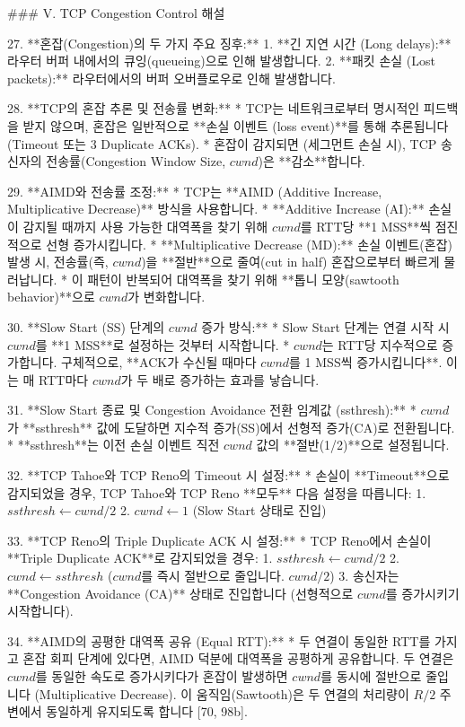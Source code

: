 ### V. TCP Congestion Control 해설

27. **혼잡(Congestion)의 두 가지 주요 징후:**
    1.  **긴 지연 시간 (Long delays):** 라우터 버퍼 내에서의 큐잉(queueing)으로 인해 발생합니다.
    2.  **패킷 손실 (Lost packets):** 라우터에서의 버퍼 오버플로우로 인해 발생합니다.

28. **TCP의 혼잡 추론 및 전송률 변화:**
    *   TCP는 네트워크로부터 명시적인 피드백을 받지 않으며, 혼잡은 일반적으로 **손실 이벤트 (loss event)**를 통해 추론됩니다 (Timeout 또는 3 Duplicate ACKs).
    *   혼잡이 감지되면 (세그먼트 손실 시), TCP 송신자의 전송률(Congestion Window Size, $cwnd$)은 **감소**합니다.

29. **AIMD와 전송률 조정:**
    *   TCP는 **AIMD (Additive Increase, Multiplicative Decrease)** 방식을 사용합니다.
    *   **Additive Increase (AI):** 손실이 감지될 때까지 사용 가능한 대역폭을 찾기 위해 $cwnd$를 RTT당 **1 MSS**씩 점진적으로 선형 증가시킵니다.
    *   **Multiplicative Decrease (MD):** 손실 이벤트(혼잡) 발생 시, 전송률(즉, $cwnd$)을 **절반**으로 줄여(cut in half) 혼잡으로부터 빠르게 물러납니다.
    *   이 패턴이 반복되어 대역폭을 찾기 위해 **톱니 모양(sawtooth behavior)**으로 $cwnd$가 변화합니다.

30. **Slow Start (SS) 단계의 $cwnd$ 증가 방식:**
    *   Slow Start 단계는 연결 시작 시 $cwnd$를 **1 MSS**로 설정하는 것부터 시작합니다.
    *   $cwnd$는 RTT당 지수적으로 증가합니다. 구체적으로, **ACK가 수신될 때마다 $cwnd$를 1 MSS씩 증가시킵니다**. 이는 매 RTT마다 $cwnd$가 두 배로 증가하는 효과를 낳습니다.

31. **Slow Start 종료 및 Congestion Avoidance 전환 임계값 (ssthresh):**
    *   $cwnd$가 **ssthresh** 값에 도달하면 지수적 증가(SS)에서 선형적 증가(CA)로 전환됩니다.
    *   **ssthresh**는 이전 손실 이벤트 직전 $cwnd$ 값의 **절반(1/2)**으로 설정됩니다.

32. **TCP Tahoe와 TCP Reno의 Timeout 시 설정:**
    *   손실이 **Timeout**으로 감지되었을 경우, TCP Tahoe와 TCP Reno **모두** 다음 설정을 따릅니다:
        1.  $ssthresh \leftarrow cwnd / 2$
        2.  $cwnd \leftarrow 1$ (Slow Start 상태로 진입)

33. **TCP Reno의 Triple Duplicate ACK 시 설정:**
    *   TCP Reno에서 손실이 **Triple Duplicate ACK**로 감지되었을 경우:
        1.  $ssthresh \leftarrow cwnd / 2$
        2.  $cwnd \leftarrow ssthresh$ ($cwnd$를 즉시 절반으로 줄입니다. $cwnd / 2$)
        3.  송신자는 **Congestion Avoidance (CA)** 상태로 진입합니다 (선형적으로 $cwnd$를 증가시키기 시작합니다).

34. **AIMD의 공평한 대역폭 공유 (Equal RTT):**
    *   두 연결이 동일한 RTT를 가지고 혼잡 회피 단계에 있다면, AIMD 덕분에 대역폭을 공평하게 공유합니다. 두 연결은 $cwnd$를 동일한 속도로 증가시키다가 혼잡이 발생하면 $cwnd$를 동시에 절반으로 줄입니다 (Multiplicative Decrease). 이 움직임(Sawtooth)은 두 연결의 처리량이 $R/2$ 주변에서 동일하게 유지되도록 합니다 [70, 98b].

